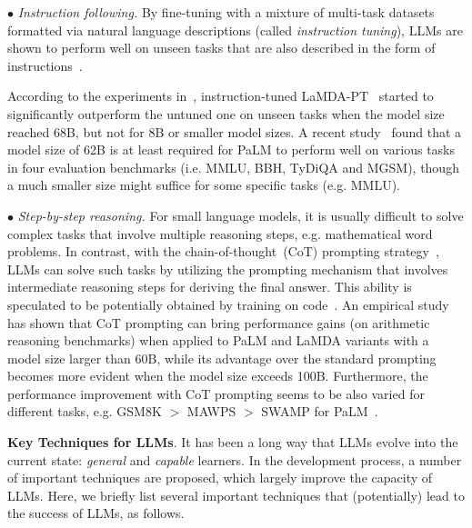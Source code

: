 $\bullet$ \emph{Instruction following.} By fine-tuning with a mixture of multi-task  datasets formatted via natural language descriptions (called  \emph{instruction tuning}), LLMs are shown to  perform well on unseen tasks that are also described in the form of  instructions~\cite{Ouyang-arxiv-2022-Training,Wei-ICLR-2022-Finetuned,Sanh-ICLR-2022-Multitask}. 

According to the experiments in~\cite{Wei-ICLR-2022-Finetuned}, instruction-tuned LaMDA-PT~\cite{Thoppilan-CoRR-2022-LaMDA} started to significantly outperform the untuned one on unseen tasks when the model size reached 68B, but not for 8B or smaller model sizes. A recent study~\cite{Chung-arxiv-2022-Scaling} found that a model size of 62B is at least required for PaLM to perform  well on various tasks in four evaluation benchmarks (i.e. MMLU, BBH, TyDiQA and MGSM), though a much smaller size might suffice for some specific tasks (e.g. MMLU). 

$\bullet$ \emph{Step-by-step reasoning.} For small language models, it is usually difficult to solve complex tasks that involve multiple reasoning steps, e.g. mathematical word problems. {In contrast, with the chain-of-thought~(CoT) prompting strategy~\cite{Wei-arxiv-2022-chain}, LLMs can solve such tasks by utilizing the prompting mechanism that involves intermediate reasoning steps for deriving the final answer.} This ability is speculated to be potentially obtained by training on code~\cite{FU-blog-2022-how,Wei-arxiv-2022-chain}. An empirical study~\cite{Wei-arxiv-2022-chain} has shown that CoT prompting can bring performance gains (on arithmetic reasoning benchmarks) when applied to PaLM and LaMDA variants with a model size larger than 60B, while its advantage over the standard prompting becomes more evident when the model size exceeds 100B. Furthermore, the performance improvement with CoT prompting seems to be also varied for different tasks, e.g. GSM8K $>$ MAWPS $>$ SWAMP for PaLM~\cite{Wei-arxiv-2022-chain}. 

\textbf{Key Techniques for LLMs}. It has been a long way that LLMs evolve into the current state:  \emph{general} and \emph{capable} learners. In the development process, a number of important techniques are proposed, which largely improve the capacity of LLMs. Here, we briefly list several important techniques that (potentially)  lead to the success of LLMs, as follows. 

